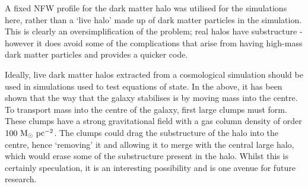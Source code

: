 A fixed NFW profile for the dark matter halo was utilised for the simulations here, rather than a `live halo' made up of dark matter particles in the simulation.
This is clearly an oversimplification of the problem; real halos have substructure - however it does avoid some of the complications that arise from having high-mass dark matter particles and provides a quicker code.

Ideally, live dark matter halos extracted from a cosmological simulation should be used in simulations used to test equations of state.
In the above, it has been shown that the way that the galaxy stabilises is by moving mass into the centre.
To transport mass into the centre of the galaxy, first large clumps must form.
These clumps have a strong gravitational field with a gas column density of order $100 ~\mathrm{M}_{\odot} ~\mathrm{pc}^{-2}$.
The clumps could drag the substructure of the halo into the centre, hence `removing' it and allowing it to merge with the central large halo, which would erase some of the substructure present in the halo.
Whilst this is certainly speculation, it is an interesting possibility and is one avenue for future research.
